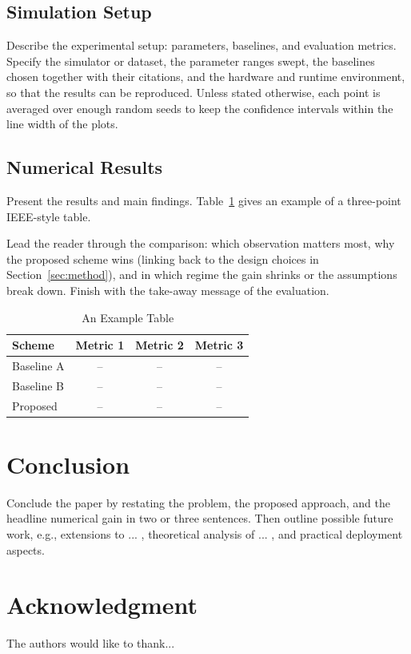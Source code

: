 \documentclass[conference]{IEEEtran}
\begin{document}
\subsection{Simulation Setup}
Describe the experimental setup: parameters, baselines, and evaluation
metrics. Specify the simulator or dataset, the parameter ranges swept,
the baselines chosen together with their citations, and the hardware and
runtime environment, so that the results can be reproduced. Unless stated
otherwise, each point is averaged over enough random seeds to keep the
confidence intervals within the line width of the plots.

\subsection{Numerical Results}
Present the results and main findings. Table~\ref{tab:comparison} gives an
example of a three-point IEEE-style table.

Lead the reader through the comparison: which observation matters most,
why the proposed scheme wins (linking back to the design choices in
Section~\ref{sec:method}), and in which regime the gain shrinks or the
assumptions break down. Finish with the take-away message of the
evaluation.

\begin{table}[!t]
\caption{An Example Table}
\label{tab:comparison}
\centering
\begin{tabular}{@{}lccc@{}}
\toprule
Scheme & Metric 1 & Metric 2 & Metric 3\\
\midrule
Baseline A & -- & -- & --\\
Baseline B & -- & -- & --\\
Proposed    & -- & -- & --\\
\bottomrule
\end{tabular}
\end{table}

\section{Conclusion}\label{sec:conclusion}
Conclude the paper by restating the problem, the proposed approach, and
the headline numerical gain in two or three sentences. Then outline
possible future work, e.g., extensions to ... , theoretical analysis
of ... , and practical deployment aspects.

\section*{Acknowledgment}
The authors would like to thank...



\end{document}

